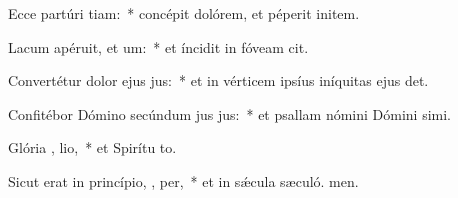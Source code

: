 \item Ecce partúri tiam:~* concépit dolórem, et péperit initem.
\item Lacum apéruit, et  um:~* et íncidit in fóveam  cit.
\item Convertétur dolor ejus   jus:~* et in vérticem ipsíus iníquitas ejus det.
\item Confitébor Dómino secúndum jus jus:~* et psallam nómini Dómini simi.
\item Glória ,  lio,~* et Spirítu to.
\item Sicut erat in princípio,  ,  per,~* et in sǽcula sæculó. men.
